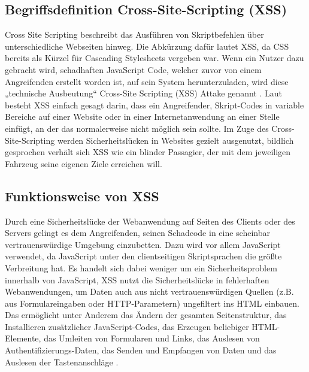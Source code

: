 \subsection{Begriffsdefinition Cross-Site-Scripting (XSS)}
\label{subsection:definition_Cross-Site-Scripting_(XSS)}

Cross Site Scripting beschreibt das Ausführen von Skriptbefehlen über unterschiedliche Webseiten hinweg. Die Abkürzung dafür lautet XSS, da CSS bereits als Kürzel für Cascading Stylesheets vergeben war. Wenn ein Nutzer dazu gebracht wird, schadhaften JavaScript Code, welcher zuvor von einem
Angreifenden erstellt worden ist, auf sein System herunterzuladen, wird diese „technische Ausbeutung“ Cross-Site Scripting (XSS) Attake genannt \autocite[2]{kirda2009}.
Laut \textcite{kachel2008} besteht XSS einfach gesagt darin, dass ein Angreifender, Skript-Codes in variable Bereiche auf einer Website oder in einer Internetanwendung an einer Stelle einfügt, an der das normalerweise nicht möglich sein sollte.  Im Zuge des Cross-Site-Scripting werden Sicherheitslücken in Websites gezielt ausgenutzt, bildlich gesprochen verhält sich XSS wie ein blinder Passagier, der mit dem jeweiligen Fahrzeug seine eigenen Ziele erreichen will.


\subsection{Funktionsweise von XSS}
\label{subsection:functionality_of_XSS}

Durch eine Sicherheitslücke der Webanwendung auf Seiten des Clients oder des Servers gelingt es dem Angreifenden, seinen Schadcode in eine scheinbar vertrauenswürdige Umgebung einzubetten. Dazu wird vor allem JavaScript verwendet, da JavaScript unter den clientseitigen Skriptsprachen die größte Verbreitung hat. Es handelt sich dabei weniger um ein Sicherheitsproblem innerhalb von JavaScript, XSS nutzt die Sicherheitslücke in fehlerhaften Webanwendungen, um Daten auch aus nicht vertrauenswürdigen Quellen (z.B. aus Formulareingaben oder HTTP-Parametern) ungefiltert ins HTML einbauen. Das ermöglicht unter Anderem das Ändern der gesamten Seitenstruktur, das Installieren zusätzlicher JavaScript-Codes, das Erzeugen beliebiger HTML-Elemente, das Umleiten von Formularen und Links, das Auslesen von Authentifizierungs-Daten, das Senden und Empfangen von Daten und das Auslesen der Tastenanschläge \autocite[16]{wolf2012}.

